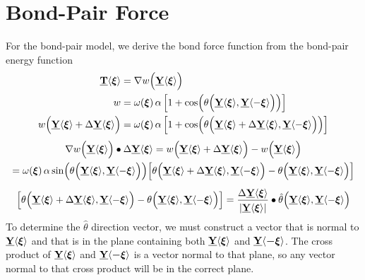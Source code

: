 \section{Bond-Pair Force}
For the bond-pair model, we derive the bond force function from the bond-pair energy function
%
\begin{align}
%
\tvstate{T}{}{\boldsymbol{\xi}} &= \nabla w\!\left(\tvstate{Y}{}{\boldsymbol{\xi}}\right)\notag \\
%
w&=\omega\!\left(\boldsymbol{\xi}\right)\alpha\left[1+\cos\!\left(\theta\!\left(\tvstate{Y}{}{\boldsymbol{\xi}},\tvstate{Y}{}{-\boldsymbol{\xi}}\right)\right)\right]\notag \\
%
w\!\left(\tvstate{Y}{}{\boldsymbol{\xi}}+\Delta\tvstate{Y}{}{\boldsymbol{\xi}}\right) &=
 \omega\!\left(\boldsymbol{\xi}\right)\alpha\left[1+\cos\!\left(\theta\!\left(\tvstate{Y}{}{\boldsymbol{\xi}}+\Delta\tvstate{Y}{}{\boldsymbol{\xi}},\tvstate{Y}{}{-\boldsymbol{\xi}}\right)\right)\right]\notag
\end{align}
%
\begin{multline}
\nabla w\!\left(\tvstate{Y}{}{\boldsymbol{\xi}}\right)\bullet\Delta\tvstate{Y}{}{\boldsymbol{\xi}}= 
w\!\left(\tvstate{Y}{}{\boldsymbol{\xi}}+\Delta\tvstate{Y}{}{\boldsymbol{\xi}}\right) -w\!\left(\tvstate{Y}{}{\boldsymbol{\xi}}\right) \notag\\
%
=\omega\!\left(\boldsymbol{\xi}\right)\alpha\sin\!\left(\theta\!\left(\tvstate{Y}{}{\boldsymbol{\xi}},\tvstate{Y}{}{-\boldsymbol{\xi}}\right)\right)\!\left[\theta\!\left(\tvstate{Y}{}{\boldsymbol{\xi}}+\Delta\tvstate{Y}{}{\boldsymbol{\xi}},\tvstate{Y}{}{-\boldsymbol{\xi}}\right)-\theta\!\left(\tvstate{Y}{}{\boldsymbol{\xi}},\tvstate{Y}{}{-\boldsymbol{\xi}}\right)\right]
\end{multline}
%
\begin{equation}
\left[\theta\!\left(\tvstate{Y}{}{\boldsymbol{\xi}}+\Delta\tvstate{Y}{}{\boldsymbol{\xi}},\tvstate{Y}{}{-\boldsymbol{\xi}}\right)-\theta\!\left(\tvstate{Y}{}{\boldsymbol{\xi}},\tvstate{Y}{}{-\boldsymbol{\xi}}\right)\right] = 
\frac{\Delta\tvstate{Y}{}{\boldsymbol{\xi}}}{|\tvstate{Y}{}{\boldsymbol{\xi}}|}\bullet \hat{\theta}\!\left(\tvstate{Y}{}{\boldsymbol{\xi}},\tvstate{Y}{}{-\boldsymbol{\xi}}\right)\notag
\end{equation}
%
To determine the $\hat{\theta}$ direction vector, we must construct a vector that is normal to $\tvstate{Y}{}{\boldsymbol{\xi}}$ and that is in the plane containing both $\vstate{Y}{}{\boldsymbol{\xi}}$ and $\vstate{Y}{}{\boldsymbol{-\xi}}$.
The cross product of $\vstate{Y}{}{\boldsymbol{\xi}}$ and $\vstate{Y}{}{\boldsymbol{-\xi}}$ is a vector normal to that plane, so any vector normal to that cross product will be in the correct plane.
